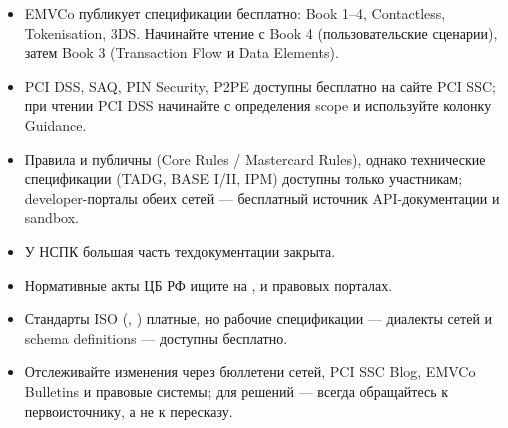 \begin{itemize}
  \item EMVCo публикует спецификации бесплатно: Book 1--4, Contactless, Tokenisation, 3DS. Начинайте чтение с Book 4
        (пользовательские сценарии), затем Book 3 (Transaction Flow и Data Elements).
  \item PCI DSS, SAQ, PIN Security, P2PE доступны бесплатно на сайте PCI SSC; при чтении PCI DSS начинайте с определения scope
        и используйте колонку Guidance.
  \item Правила  и  публичны
        (Core Rules / Mastercard Rules), однако технические
        спецификации (TADG, BASE I/II, IPM) доступны
        только участникам; developer-порталы обеих сетей —
        бесплатный источник API-документации и sandbox.
  \item У НСПК большая часть техдокументации закрыта.
  \item Нормативные акты ЦБ РФ ищите на ,
         и правовых порталах.
  \item Стандарты ISO (, ) платные,
        но рабочие спецификации — диалекты сетей и schema
        definitions  — доступны бесплатно.
  \item Отслеживайте изменения через бюллетени сетей,
        PCI SSC Blog, EMVCo Bulletins и правовые системы;
        для решений — всегда обращайтесь к первоисточнику,
        а не к пересказу.
\end{itemize}
